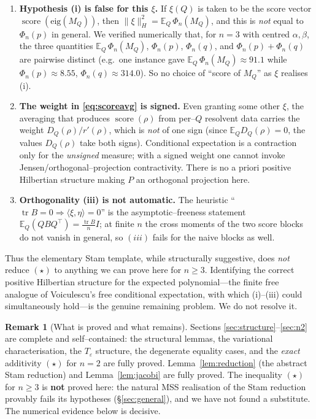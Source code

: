 \documentclass[12pt]{article}
\theoremstyle{definition}
\newtheorem{remark}{Remark}
\DeclareMathOperator{\score}{score}
\DeclareMathOperator{\tr}{tr}
\newcommand{\bE}{\mathbb{E}}
\begin{document}
\begin{enumerate}
\item \textbf{Hypothesis (i) is false for this $\xi$.} If $\xi(Q)$ is taken to be the score
vector $\score(\mathrm{eig}(M_Q))$, then $\|\xi\|_H^2=\bE_Q\,\Phi_n(M_Q)$, and this is
\emph{not} equal to $\Phi_n(p)$ in general. We verified numerically that, for $n=3$ with
centred $\alpha,\beta$, the three quantities $\bE_Q\,\Phi_n(M_Q)$, $\Phi_n(p)$, $\Phi_n(q)$,
and $\Phi_n(p)+\Phi_n(q)$ are pairwise distinct (e.g.\ one instance gave
$\bE_Q\,\Phi_n(M_Q)\approx91.1$ while $\Phi_n(p)\approx8.55$, $\Phi_n(q)\approx314.0$). So no
choice of ``score of $M_Q$'' as $\xi$ realises (i).

\item \textbf{The weight in \eqref{eq:scoreavg} is signed.} Even granting some other $\xi$,
the averaging that produces $\score(\rho)$ from per--$Q$ resolvent data carries the weight
$D_Q(\rho)/r'(\rho)$, which is \emph{not} of one sign (since $\bE_Q D_Q(\rho)=0$, the values
$D_Q(\rho)$ take both signs). Conditional expectation is a contraction only for the
\emph{unsigned} measure; with a signed weight one cannot invoke Jensen/orthogonal--projection
contractivity. There is no a priori positive Hilbertian structure making $P$ an orthogonal
projection here.

\item \textbf{Orthogonality (iii) is not automatic.} The heuristic ``$\tr B=0\Rightarrow
\langle\xi,\eta\rangle=0$'' is the asymptotic--freeness statement $\bE_Q(QBQ^\top)=
\tfrac{\tr B}{n}I$; at finite $n$ the cross moments of the two score blocks do not vanish in
general, so $(iii)$ fails for the naive blocks as well.
\end{enumerate}

Thus the elementary Stam template, while structurally suggestive, does \emph{not} reduce
$(\star)$ to anything we can prove here for $n\ge3$. Identifying the correct positive
Hilbertian structure for the expected polynomial---the finite free analogue of Voiculescu's
free conditional expectation, with which (i)--(iii) could simultaneously hold---is the genuine
remaining problem. We do not resolve it.

\begin{remark}[What is proved and what remains]\label{rem:honest}
Sections \ref{sec:structure}--\ref{sec:n2} are complete and self--contained: the structural
lemmas, the variational characterisation, the $T_\varepsilon$ structure, the degenerate
equality cases, and the \emph{exact} additivity $(\star)$ for $n=2$ are fully proved.
Lemma~\ref{lem:reduction} (the abstract Stam reduction) and Lemma~\ref{lem:jacobi} are fully
proved. The inequality $(\star)$ for $n\ge3$ is \textbf{not} proved here: the natural MSS
realisation of the Stam reduction provably fails its hypotheses (\S\ref{sec:general}), and we
have not found a substitute. The numerical evidence below is decisive.
\end{remark}
\end{document}
